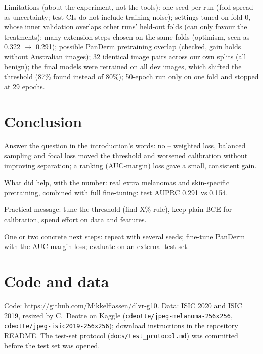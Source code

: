 \begin{notes}
  \item Limitations (about the experiment, not the tools): one seed per run (fold spread as uncertainty; test CIs do not include training noise); settings tuned on fold 0, whose inner validation overlaps other runs' held-out folds (can only favour the treatments); many extension steps chosen on the same folds (optimism, seen as 0.322 $\to$ 0.291); possible PanDerm pretraining overlap (checked, gain holds without Australian images); 32 identical image pairs across our own splits (all benign); the final models were retrained on all dev images, which shifted the threshold (87\% found instead of 80\%); 50-epoch run only on one fold and stopped at 29 epochs.
\end{notes}

\section{Conclusion}
\label{sec:conclusion}
\begin{notes}
  \item Answer the question in the introduction's words: no -- weighted loss, balanced sampling and focal loss moved the threshold and worsened calibration without improving separation; a ranking (AUC-margin) loss gave a small, consistent gain.
  \item What did help, with the number: real extra melanomas and skin-specific pretraining, combined with full fine-tuning: test AUPRC 0.291 vs 0.154.
  \item Practical message: tune the threshold (find-X\% rule), keep plain BCE for calibration, spend effort on data and features.
  \item One or two concrete next steps: repeat with several seeds; fine-tune PanDerm with the AUC-margin loss; evaluate on an external test set.
\end{notes}

\section*{Code and data}
Code: \url{https://github.com/Mikkelflassen/dlvr-g10}. Data: ISIC 2020 and ISIC 2019, resized by C.~Deotte on Kaggle (\texttt{cdeotte/jpeg-melanoma-256x256}, \texttt{cdeotte/jpeg-isic2019-256x256}); download instructions in the repository README. The test-set protocol (\texttt{docs/test\_protocol.md}) was committed before the test set was opened.

